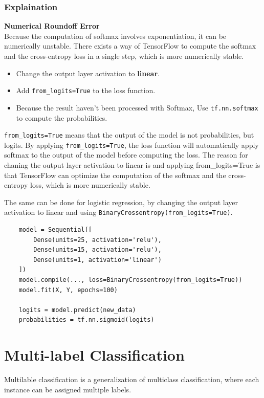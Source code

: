 \subsubsection*{Explaination}
\textbf{Numerical Roundoff Error}\\
    Because the computation of softmax involves exponentiation, it can be numerically unstable.
    There exists a way of TensorFlow to compute the softmax and the cross-entropy loss in a single step, which is more numerically stable.
\begin{notebox}
    \begin{itemize}
        \item Change the output layer activation to \textbf{linear}.
        \item Add \colorbox{mycolor}{\texttt{from\_logits=True}} to the loss function.
        \item Because the result haven't been processed with Softmax, Use \colorbox{mycolor}{\texttt{tf.nn.softmax}} to compute the probabilities.
    \end{itemize}
    \hspace{2em}\texttt{from\_logits=True} means that the output of the model is not probabilities, but logits.
    By applying \texttt{from\_logits=True}, the loss function will automatically apply softmax to the output of the model before computing the loss.
    The reason for chaning the output layer activation to linear is and applying from\_logits=True is that TensorFlow can optimize the computation of the softmax 
    and the cross-entropy loss, which is more numerically stable.
\end{notebox}
\par
The same can be done for logistic regression, by changing the output layer activation to linear and using \texttt{BinaryCrossentropy(from\_logits=True)}.
\begin{verbatim}
    model = Sequential([
        Dense(units=25, activation='relu'),
        Dense(units=15, activation='relu'),
        Dense(units=1, activation='linear')
    ])
    model.compile(..., loss=BinaryCrossentropy(from_logits=True))
    model.fit(X, Y, epochs=100)

    logits = model.predict(new_data)
    probabilities = tf.nn.sigmoid(logits)
\end{verbatim}


\section{Multi-label Classification}
Multilable classification is a generalization of multiclass classification, where each instance can be assigned multiple labels.

